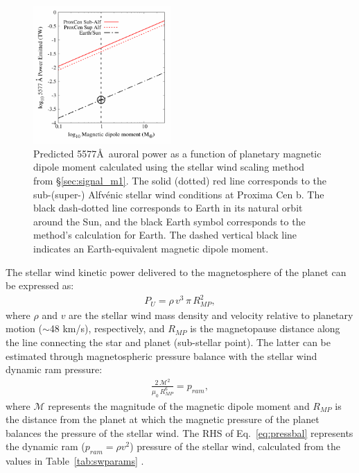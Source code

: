 \documentclass{emulateapj}
\newcommand{\XXX}[1]{#1}      %
\begin{document}
\begin{figure}[bt]
\includegraphics[width=0.47\textwidth, angle=0]{plot_swpower.pdf}
\caption{\XXX{Predicted 5577\AA\ auroral power as a function of planetary magnetic dipole moment calculated using the stellar wind scaling method from \S\ref{sec:signal_m1}. The solid (dotted) red line corresponds to the sub-\mbox{(super-)} Alfv\'{e}nic stellar wind conditions at Proxima Cen b. The black dash-dotted line corresponds to Earth in its natural orbit around the Sun, and the black Earth symbol corresponds to the method's calculation for Earth. The dashed vertical black line indicates an Earth-equivalent magnetic dipole moment.\\[0in]}}
\label{fig:auroral_power}
\end{figure}

The stellar wind kinetic power delivered to the magnetosphere of the planet can be expressed as:
\begin{align}
    P_{U} = \rho\,v^3\,\pi\,R_{MP}^2, \label{eq:swpower}
\end{align}
\noindent where $\rho$ and $v$ are the stellar wind mass density and velocity \XXX{relative to planetary motion ($\sim$48 km/s)}, respectively, and $R_{MP}$ is the magnetopause distance along the line connecting the star and planet (sub-stellar point). The latter can be estimated through magnetospheric pressure balance with the stellar wind dynamic ram pressure:
\begin{align}
    \frac{2\,\mathcal{M}^2}{\mu_0\,R_{MP}^6} = p_{ram}, \label{eq:pressbal}
\end{align}
where $\mathcal{M}$ represents the magnitude of the magnetic dipole moment and $R_{MP}$ is the distance from the planet at which the magnetic pressure of the planet balances the pressure of the stellar wind. \XXX{The RHS of Eq.~\ref{eq:pressbal} represents the dynamic ram ($p_{ram}=\rho v^2$) pressure of the stellar wind, calculated from the values in Table~\ref{tab:swparams} \citep[e.g.][]{Schield1969}.}
\end{document}
